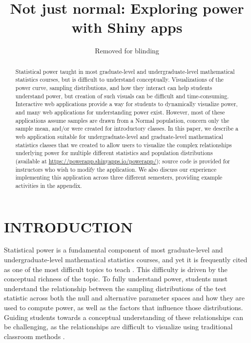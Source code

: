 \documentclass{TISE}
\title{Not just normal: Exploring power with Shiny apps}
\author{Removed for blinding}
\begin{document}
	
\setcounter{page}{3}

\begin{abstract}
	Statistical power taught in most graduate-level and undergraduate-level mathematical statistics courses, but is difficult to understand conceptually. Visualizations of the power curve, sampling distributions, and how they interact can help students understand power, but creation of such visuals can be difficult and time-consuming. Interactive web applications provide a way for students to dynamically visualize power, and many web applications for understanding power exist. However, most of these applications assume samples are drawn from a Normal population, concern only the sample mean, and/or were created for introductory classes. In this paper, we describe a web application suitable for undergraduate-level and graduate-level mathematical statistics classes that we created to allow users to visualize the complex relationships underlying power for multiple different statistics and population distributions (available at \url{https://powerapp.shinyapps.io/powerapp/}); source code is provided for instructors who wish to modify the application. We also discuss our experience implementing this application across three different semesters, providing example activities in the appendix.  
\end{abstract}
	
\section{INTRODUCTION}

Statistical power is a fundamental component of most graduate-level and undergraduate-level mathematical statistics courses, and yet it is frequently cited as one of the most difficult topics to teach \citep{aberson2002}. This difficulty is driven by the conceptual richness of the topic. To fully understand power, students must understand the relationship between the sampling distributions of the test statistic across both the null and alternative parameter spaces and how they are used to compute power, as well as the factors that influence those distributions. Guiding students towards a conceptual understanding of these relationships can be challenging, as the relationships are difficult to visualize using traditional classroom methods \citep{aberson2002}.
\end{document}
